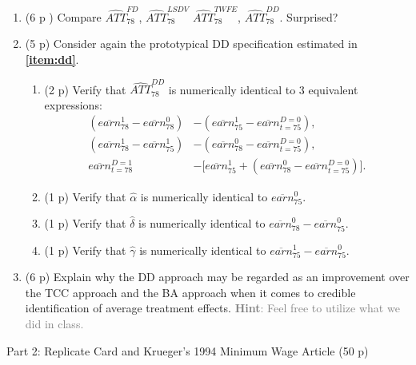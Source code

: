 \documentclass{article}
\begin{document}
\begin{enumerate}[label=\textbf{Q\arabic{enumi}}.,ref=Q\arabic{enumi}, wide=0pt, itemsep=0em, topsep=5pt, labelindent=0pt]
\item (6 p ) Compare $\widehat{ATT}_{78}^{FD}$, $\widehat{ATT}_{78}^{LSDV}$ $\widehat{ATT}_{78}^{TWFE}$, $\widehat{ATT}_{78}^{DD}$. Surprised?


\item (5 p) Consider again the prototypical DD specification estimated in \textbf{\ref{item:dd}}.

\begin{enumerate}
\item (2 p) Verify that $\widehat{ATT}_{78}^{DD}$ is numerically identical to 3 equivalent expressions:\label{item:DinD-diff} 
\begin{align}
\left( \overline{earn}_{78}^{1}-\overline{earn}_{78}^{0}\right) &-\left( \overline{earn}_{75}^{1}-\overline{earn}_{t=75}^{D=0}\right),\label{eq:DDv1} \\
\left( \overline{earn}_{78}^{1} -\overline{earn}_{75}^{1}\right) &-\left( \overline{earn}_{78}^{0}-\overline{earn}_{t=75}^{D=0}\right),\label{eq:DDv2} \\ 
\overline{earn}_{t=78}^{D=1} &- \big[ \overline{earn}_{75}^{1}+ \left( \overline{earn}_{78}^{0}-\overline{earn}_{t=75}^{D=0}\right) \big].\label{eq:DDv3}
\end{align}
\item (1 p) Verify that $\hat{\alpha}$ is numerically identical to $\overline{earn}_{75}^{0}$.
\item (1 p) Verify that $\hat{\delta}$ is numerically identical to $\overline{earn}_{78}^{0}-\overline{earn}_{75}^{0}$.
\item (1 p) Verify that $\hat{\gamma}$ is numerically identical to $\overline{earn}_{75}^{1}-\overline{earn}_{75}^{0}$.
\end{enumerate}

\item (6 p) Explain why the DD approach may be regarded as an improvement over the TCC approach and the BA approach when it comes to credible identification of average treatment effects. \textcolor{gray}{\textbf{Hint}: Feel free to utilize what we did in class.}
\end{enumerate}

\begin{center}
{\LARGE Part 2: Replicate Card and Krueger's 1994 Minimum Wage Article (50 p)}
\end{center}
\end{document}
